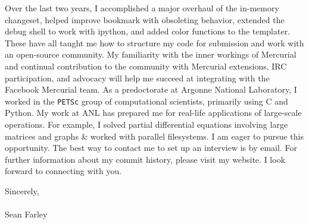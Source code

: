 \documentclass[]{fancy-cv}
\begin{document}
Over the last two years, I accomplished a major overhaul of the in-memory
changeset, helped improve bookmark with obsoleting behavior, extended the debug
shell to work with ipython, and added color functions to the templater. These
have all taught me how to structure my code for submission and work with an
open-source community. My familiarity with the inner workings of Mercurial and
continual contribution to the community with Mercurial extensions, IRC
participation, and advocacy will help me succeed at integrating with the
Facebook Mercurial team.
%
\newline\newline
%
As a predoctorate at Argonne National Laboratory, I worked in the
\texttt{PETSc} group of computational scientists, primarily using C and
Python. My work at ANL has prepared me for real-life applications of
large-scale operations. For example, I solved partial differential equations
involving large matrices and graphs \& worked with parallel filesystems.
%
\newline\newline
%
I am eager to pursue this opportunity. The best way to contact me to set up an
interview is by email. For further information about my commit history, please
visit my website. I look forward to connecting with you.

\vspace{2em}
Sincerely,\\
\\
Sean Farley
\end{document}
